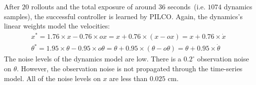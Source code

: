 \noindent After $20$ rollouts and the total exposure of around $36$ seconds\ (i.e. $1074$ dynamics samples), the successful controller is learned by PILCO. Again, the dynamics's linear weights model the velocities:
\begin{equation}
\begin{split}
x^{*} = 1.76 \times x - 0.76 \times ox = x + 0.76 \times (x-ox) = x + 0.76 \times \dot{x} \\ \nonumber
\theta^{*} = 1.95 \times \theta - 0.95 \times o \theta = \theta + 0.95 \times (\theta-o \theta) = \theta + 0.95 \times  \dot{\theta} \nonumber
\end{split}
\end{equation}
The noise levels of the dynamics model are low. There is a $0.2^{\circ}$ observation noise on $\theta$. However, the observation noise is not propagated through the time-series model. All of the noise levels on $x$ are less than $0.025$ cm. 

